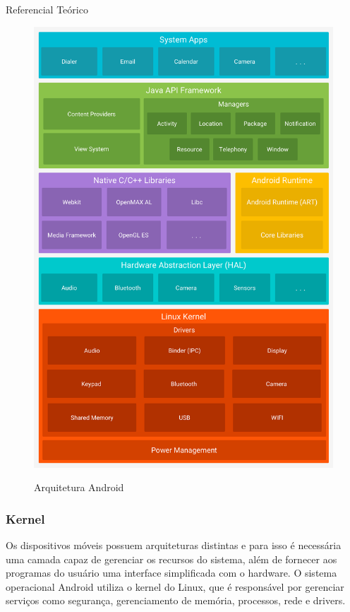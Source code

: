 \documentclass[
	12pt,				%
	openright,			%
	twoside,			%
	a4paper,			%
	english,			%
	french,				%
	spanish,			%
	brazil				%
	]{abntex2}
\begin{document}
\begin{chapter}{Referencial Teórico}
\begin{figure}[h]
\centering
   \caption{Arquitetura Android}
   \includegraphics[scale=0.20]{media/android-stack_2x.png}
     \label{fig:arquitetura}
\end{figure}

\newpage

\subsubsection{Kernel}
Os dispositivos móveis possuem arquiteturas distintas e para isso é necessária uma camada capaz de gerenciar os recursos do sistema, além de fornecer aos programas do usuário uma interface simplificada com o hardware.
O sistema operacional Android utiliza o kernel do Linux, que é responsável por gerenciar serviços como segurança, gerenciamento de memória, processos, rede e drivers.


\end{chapter}
\end{document}
